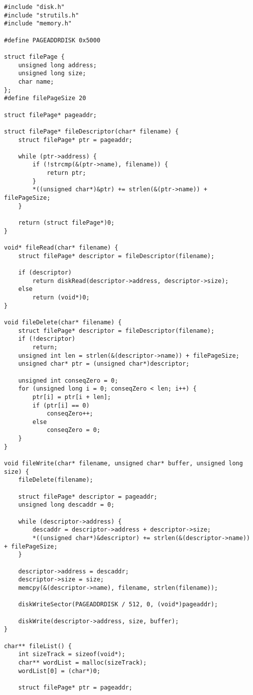 \documentclass{article}
\begin{document}
\begin{verbatim}
#include "disk.h"
#include "strutils.h"
#include "memory.h"

#define PAGEADDRDISK 0x5000

struct filePage {
	unsigned long address;
	unsigned long size;
	char name;
};
#define filePageSize 20

struct filePage* pageaddr;

struct filePage* fileDescriptor(char* filename) {
	struct filePage* ptr = pageaddr;

	while (ptr->address) {
		if (!strcmp(&(ptr->name), filename)) {
			return ptr;
		}
		*((unsigned char*)&ptr) += strlen(&(ptr->name)) + filePageSize;
	}

	return (struct filePage*)0;
}

void* fileRead(char* filename) {
	struct filePage* descriptor = fileDescriptor(filename);

	if (descriptor)
		return diskRead(descriptor->address, descriptor->size);
	else
		return (void*)0;
}

void fileDelete(char* filename) {
	struct filePage* descriptor = fileDescriptor(filename);
	if (!descriptor)
		return;
	unsigned int len = strlen(&(descriptor->name)) + filePageSize;
	unsigned char* ptr = (unsigned char*)descriptor;

	unsigned int conseqZero = 0;
	for (unsigned long i = 0; conseqZero < len; i++) {
		ptr[i] = ptr[i + len];
		if (ptr[i] == 0)
			conseqZero++;
		else
			conseqZero = 0;
	}
}

void fileWrite(char* filename, unsigned char* buffer, unsigned long size) {
	fileDelete(filename);

	struct filePage* descriptor = pageaddr;
	unsigned long descaddr = 0;

	while (descriptor->address) {
		descaddr = descriptor->address + descriptor->size;
		*((unsigned char*)&descriptor) += strlen(&(descriptor->name)) + filePageSize;
	}

	descriptor->address = descaddr;
	descriptor->size = size;
	memcpy(&(descriptor->name), filename, strlen(filename));

	diskWriteSector(PAGEADDRDISK / 512, 0, (void*)pageaddr);

	diskWrite(descriptor->address, size, buffer);
}

char** fileList() {
	int sizeTrack = sizeof(void*);
	char** wordList = malloc(sizeTrack);
	wordList[0] = (char*)0;

	struct filePage* ptr = pageaddr;


\end{verbatim}
\end{document}

